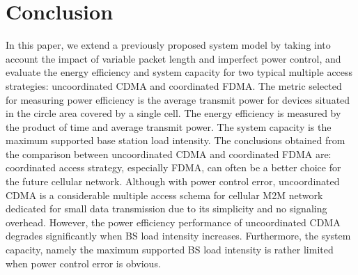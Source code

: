 \section{Conclusion}
\label{sec:conclusion} 
%
In this paper, we extend a previously proposed system model by taking into account the impact of variable packet length and imperfect power control, and evaluate the energy efficiency and system capacity for two typical multiple access strategies: uncoordinated CDMA and coordinated FDMA. The metric selected for measuring power efficiency is the average transmit power for devices situated in the circle area covered by a single cell. The energy efficiency is measured by the product of time and average transmit power. The system capacity is the maximum supported base station load intensity. 
The conclusions obtained from the comparison between uncoordinated CDMA and coordinated FDMA are: 
coordinated access strategy, especially FDMA, can often be a better choice for the future cellular network.
Although with power control error, uncoordinated CDMA is a considerable multiple access schema for cellular M2M network dedicated for small data transmission due to its simplicity and no signaling overhead. However, the power efficiency performance of uncoordinated CDMA degrades significantly when BS load intensity increases. Furthermore, the system capacity, namely the maximum supported BS load intensity is rather limited when power control error is obvious.

